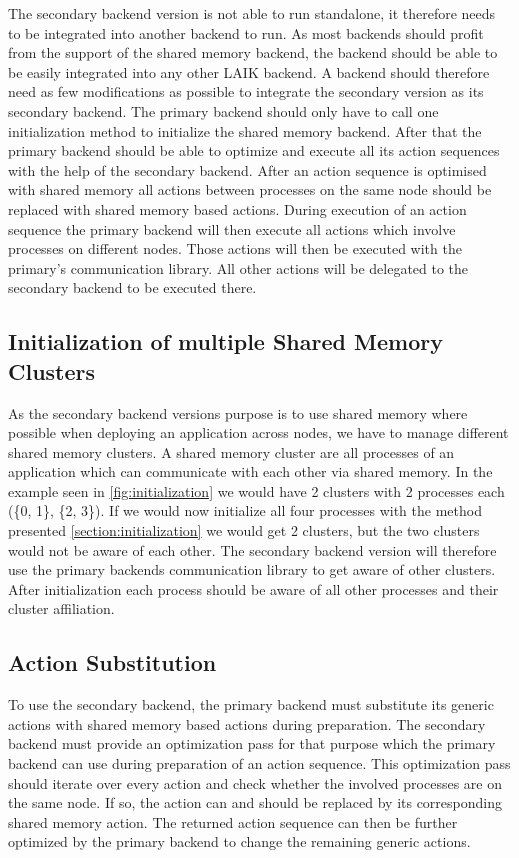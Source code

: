 The secondary backend version is not able to run standalone, it therefore needs to be integrated into another backend to run.
As most backends should profit from the support of the shared memory backend, the backend should be able to be easily integrated into any other LAIK backend.
A backend should therefore need as few modifications as possible to integrate the secondary version as its secondary backend. 
The primary backend should only have to call one initialization method to initialize the shared memory backend.
After that the primary backend should be able to optimize and execute all its action sequences with the help of the secondary backend.
After an action sequence is optimised with shared memory all actions between processes on the same node should be replaced with shared memory based actions.
During execution of an action sequence the primary backend will then execute all actions which involve processes on different nodes.
Those actions will then be executed with the primary's communication library.
All other actions will be delegated to the secondary backend to be executed there.

\subsection{Initialization of multiple Shared Memory Clusters}\label{section:init_multiple_clusters}

As the secondary backend versions purpose is to use shared memory where possible when deploying an application across nodes, we have to manage different shared memory clusters.
A shared memory cluster are all processes of an application which can communicate with each other via shared memory.
In the example seen in \autoref{fig:initialization} we would have 2 clusters with 2 processes each (\{0, 1\}, \{2, 3\}).
If we would now initialize all four processes with the method presented \autoref{section:initialization} we would get 2 clusters, but the two clusters would not be aware of each other.
The secondary backend version will therefore use the primary backends communication library to get aware of other clusters.
After initialization each process should be aware of all other processes and their cluster affiliation.

\subsection{Action Substitution}

To use the secondary backend, the primary backend must substitute its generic actions with shared memory based actions during preparation.
The secondary backend must provide an optimization pass for that purpose which the primary backend can use during preparation of an action sequence.
This optimization pass should iterate over every action and check whether the involved processes are on the same node.
If so, the action can and should be replaced by its corresponding shared memory action.
The returned action sequence can then be further optimized by the primary backend to change the remaining generic actions.